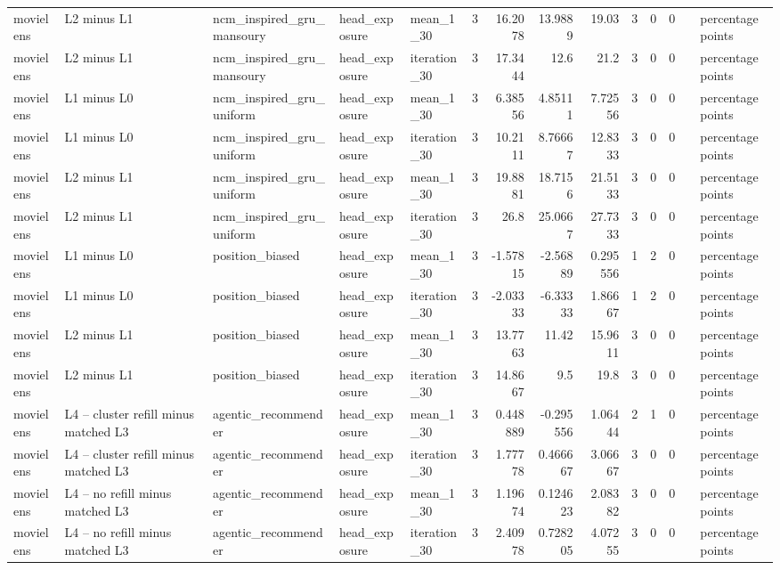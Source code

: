 \begin{table}[htbp!]
\begin{tabular}{lllllrrrrrrrll}
movielens & L2 minus L1 & ncm\_inspired\_gru\_mansoury & head\_exposure & mean\_1\_30 & 3 & 16.2078 & 13.9889 & 19.03 & 3 & 0 & 0 &  & percentage points \\
movielens & L2 minus L1 & ncm\_inspired\_gru\_mansoury & head\_exposure & iteration\_30 & 3 & 17.3444 & 12.6 & 21.2 & 3 & 0 & 0 &  & percentage points \\
movielens & L1 minus L0 & ncm\_inspired\_gru\_uniform & head\_exposure & mean\_1\_30 & 3 & 6.38556 & 4.85111 & 7.72556 & 3 & 0 & 0 &  & percentage points \\
movielens & L1 minus L0 & ncm\_inspired\_gru\_uniform & head\_exposure & iteration\_30 & 3 & 10.2111 & 8.76667 & 12.8333 & 3 & 0 & 0 &  & percentage points \\
movielens & L2 minus L1 & ncm\_inspired\_gru\_uniform & head\_exposure & mean\_1\_30 & 3 & 19.8881 & 18.7156 & 21.5133 & 3 & 0 & 0 &  & percentage points \\
movielens & L2 minus L1 & ncm\_inspired\_gru\_uniform & head\_exposure & iteration\_30 & 3 & 26.8 & 25.0667 & 27.7333 & 3 & 0 & 0 &  & percentage points \\
movielens & L1 minus L0 & position\_biased & head\_exposure & mean\_1\_30 & 3 & -1.57815 & -2.56889 & 0.295556 & 1 & 2 & 0 &  & percentage points \\
movielens & L1 minus L0 & position\_biased & head\_exposure & iteration\_30 & 3 & -2.03333 & -6.33333 & 1.86667 & 1 & 2 & 0 &  & percentage points \\
movielens & L2 minus L1 & position\_biased & head\_exposure & mean\_1\_30 & 3 & 13.7763 & 11.42 & 15.9611 & 3 & 0 & 0 &  & percentage points \\
movielens & L2 minus L1 & position\_biased & head\_exposure & iteration\_30 & 3 & 14.8667 & 9.5 & 19.8 & 3 & 0 & 0 &  & percentage points \\
movielens & L4 -- cluster refill minus matched L3 & agentic\_recommender & head\_exposure & mean\_1\_30 & 3 & 0.448889 & -0.295556 & 1.06444 & 2 & 1 & 0 &  & percentage points \\
movielens & L4 -- cluster refill minus matched L3 & agentic\_recommender & head\_exposure & iteration\_30 & 3 & 1.77778 & 0.466667 & 3.06667 & 3 & 0 & 0 &  & percentage points \\
movielens & L4 -- no refill minus matched L3 & agentic\_recommender & head\_exposure & mean\_1\_30 & 3 & 1.19674 & 0.124623 & 2.08382 & 3 & 0 & 0 &  & percentage points \\
movielens & L4 -- no refill minus matched L3 & agentic\_recommender & head\_exposure & iteration\_30 & 3 & 2.40978 & 0.728205 & 4.07255 & 3 & 0 & 0 &  & percentage points \\

\end{tabular}
\end{table}
